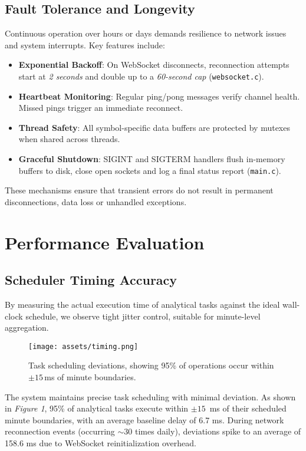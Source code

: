 \documentclass{article}
\begin{document}
\subsection{Fault Tolerance and Longevity}
Continuous operation over hours or days demands resilience to network issues and system interrupts. Key features include:
\begin{itemize}
  \item \textbf{Exponential Backoff}: On WebSocket disconnects, reconnection attempts start at \textit{2 seconds} and double up to a \textit{60-second cap} (\texttt{websocket.c}).
  \item \textbf{Heartbeat Monitoring}: Regular ping/pong messages verify channel health. Missed pings trigger an immediate reconnect.
  \item \textbf{Thread Safety}: All symbol-specific data buffers are protected by mutexes when shared across threads.
  \item \textbf{Graceful Shutdown}: SIGINT and SIGTERM handlers flush in-memory buffers to disk, close open sockets and log a final status report (\texttt{main.c}).
\end{itemize}
These mechanisms ensure that transient errors do not result in permanent disconnections, data loss or unhandled exceptions.

\section{Performance Evaluation}

\subsection{Scheduler Timing Accuracy}
By measuring the actual execution time of analytical tasks against the ideal wall-clock schedule, we observe tight jitter control, suitable for minute-level aggregation.
\begin{figure}[H]
  \centering
  \texttt{[image: assets/timing.png]}
  \caption{Task scheduling deviations, showing 95\% of operations occur within $\pm15$\,ms of minute boundaries.}
\end{figure}

The system maintains precise task scheduling with minimal deviation. As shown in \textit{Figure 1}, 95\% of analytical tasks execute within $\pm15$\ ms of their scheduled minute boundaries, with an average baseline delay of 6.7 ms. During network reconnection events (occurring $\sim30$ times daily), deviations spike to an average of 158.6 ms due to WebSocket reinitialization overhead.
\end{document}
